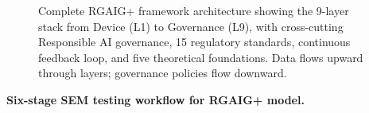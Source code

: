 \begin{figure}[!htbp]
{%
}%
\caption[One-Page RGAIG+ Framework Architecture]{Complete RGAIG+ framework architecture showing the 9-layer stack from Device (L1) to Governance (L9), with cross-cutting Responsible AI governance, 15 regulatory standards, continuous feedback loop, and five theoretical foundations. Data flows upward through layers; governance policies flow downward.}
\label{fig:rgaig_one_page_framework_theory}
\end{figure}

\noindent\textbf{Six-stage SEM testing workflow for RGAIG+ model.}

